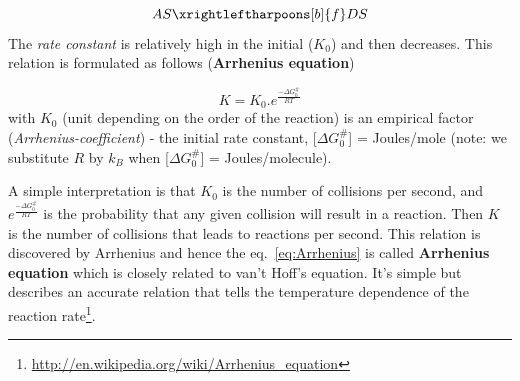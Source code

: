 \begin{equation}
  \label{eq:ASDS}
  AS  \xrightleftharpoons[b]{f} DS  
\end{equation}
The {\it rate constant} is relatively high in the initial ($K_0$) and
then decreases. This relation is formulated as follows ({\bf Arrhenius equation})

\begin{equation}\label{eq:Arrhenius}
  K = K_0.e^\frac{-\Delta G_0^\#}{RT}
\end{equation}
with $K_0$ (unit depending on the order of the reaction) is an
empirical factor ({\it Arrhenius-coefficient}) - the initial rate
constant, [$\Delta G_0^\#$] = Joules/mole (note: we substitute $R$ by
$k_B$ when [$\Delta G_0^\#$] = Joules/molecule).

A simple interpretation is that $K_0$ is the number of collisions per
second, and $e^\frac{-\Delta G_0^\#}{RT}$ is the probability that any
given collision will result in a reaction. Then $K$ is the number of
collisions that leads to reactions per second. This relation is
discovered by Arrhenius and hence the eq.~\eqref{eq:Arrhenius} is
called {\bf Arrhenius equation} which is closely related to van't
Hoff's equation. It's simple but describes an accurate relation that
tells the temperature dependence of the reaction
rate\footnote{\url{http://en.wikipedia.org/wiki/Arrhenius_equation}}.


